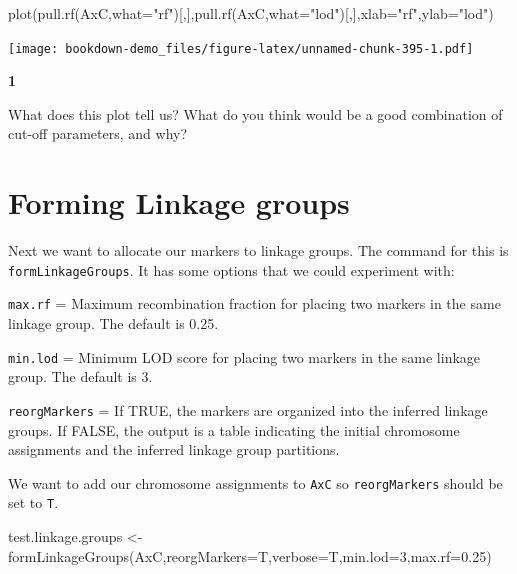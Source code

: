 \documentclass[
]{book}
\makeatletter
\newenvironment{Shaded}{\begin{snugshade}}{\end{snugshade}}
\newcommand{\AttributeTok}[1]{\textcolor[rgb]{0.77,0.63,0.00}{#1}}
\newcommand{\DecValTok}[1]{\textcolor[rgb]{0.00,0.00,0.81}{#1}}
\newcommand{\FloatTok}[1]{\textcolor[rgb]{0.00,0.00,0.81}{#1}}
\newcommand{\FunctionTok}[1]{\textcolor[rgb]{0.00,0.00,0.00}{#1}}
\newcommand{\NormalTok}[1]{#1}
\newcommand{\OtherTok}[1]{\textcolor[rgb]{0.56,0.35,0.01}{#1}}
\newcommand{\StringTok}[1]{\textcolor[rgb]{0.31,0.60,0.02}{#1}}
\newenvironment{kframe}{%
\medskip{}
\setlength{\fboxsep}{.8em}
 \def\at@end@of@kframe{}%
 \ifinner\ifhmode%
  \def\at@end@of@kframe{\end{minipage}}%
  \begin{minipage}{\columnwidth}%
 \fi\fi%
 \def\FrameCommand##1{\hskip\@totalleftmargin \hskip-\fboxsep
 \colorbox{shadecolor}{##1}\hskip-\fboxsep
     \hskip-\linewidth \hskip-\@totalleftmargin \hskip\columnwidth}%
 \MakeFramed {\advance\hsize-\width
   \@totalleftmargin\z@ \linewidth\hsize
   \@setminipage}}%
 {\par\unskip\endMakeFramed%
 \at@end@of@kframe}
\newenvironment{rmdblock}[1]
  {
  \begin{itemize}
  \renewcommand{\labelitemi}{
    \raisebox{-.7\height}[0pt][0pt]{
      {\setkeys{Gin}{width=3em,keepaspectratio}\texttt{[image: images/\#1]}}
    }
  }
  \setlength{\fboxsep}{1em}
  \begin{kframe}
  \item
  }
  {
  \end{kframe}
  \end{itemize}
  }
\newenvironment{rmdquiz}
  {\begin{rmdblock}{quiz}}
  {\end{rmdblock}}
\makeatother
\begin{document}
\begin{Shaded}
\begin{Highlighting}[]
\FunctionTok{plot}\NormalTok{(}\FunctionTok{pull.rf}\NormalTok{(AxC,}\AttributeTok{what=}\StringTok{"rf"}\NormalTok{)[,],}\FunctionTok{pull.rf}\NormalTok{(AxC,}\AttributeTok{what=}\StringTok{"lod"}\NormalTok{)[,],}\AttributeTok{xlab=}\StringTok{"rf"}\NormalTok{,}\AttributeTok{ylab=}\StringTok{"lod"}\NormalTok{) }
\end{Highlighting}
\end{Shaded}

\texttt{[image: bookdown-demo\_files/figure-latex/unnamed-chunk-395-1.pdf]}

\begin{rmdquiz}
\textbf{1}

What does this plot tell us? What do you think would be a good combination of cut-off parameters, and why?
\end{rmdquiz}

\hypertarget{forming-linkage-groups}{%
\section{Forming Linkage groups}\label{forming-linkage-groups}}

Next we want to allocate our markers to linkage groups. The command for this is \texttt{formLinkageGroups}. It has some options that we could experiment with:

\texttt{max.rf} = Maximum recombination fraction for placing two markers in the same linkage group. The default is 0.25.

\texttt{min.lod} = Minimum LOD score for placing two markers in the same linkage group. The default is 3.

\texttt{reorgMarkers} = If TRUE, the markers are organized into the inferred linkage groups. If FALSE, the output is a table indicating the initial chromosome assignments and the inferred linkage group partitions.

We want to add our chromosome assignments to \texttt{AxC} so \texttt{reorgMarkers} should be set to \texttt{T}.

\begin{Shaded}
\begin{Highlighting}[]
\NormalTok{test.linkage.groups }\OtherTok{\textless{}{-}}
\FunctionTok{formLinkageGroups}\NormalTok{(AxC,}\AttributeTok{reorgMarkers=}\NormalTok{T,}\AttributeTok{verbose=}\NormalTok{T,}\AttributeTok{min.lod=}\DecValTok{3}\NormalTok{,}\AttributeTok{max.rf=}\FloatTok{0.25}\NormalTok{) }
\end{Highlighting}
\end{Shaded}
\end{document}
